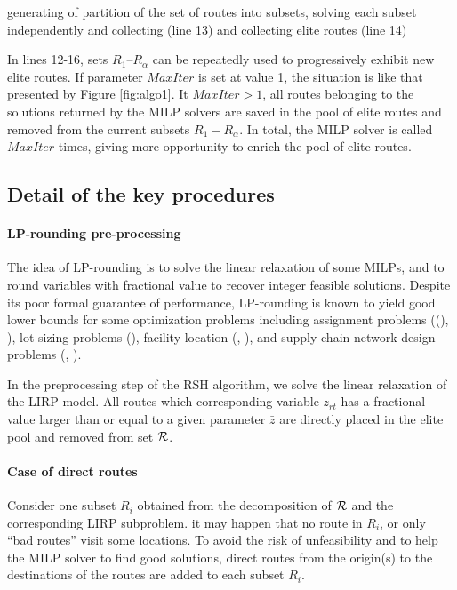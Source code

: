 \documentclass[a4paper,10pt]{article}
\begin{document}
\begin{linenumbers}
 generating of partition of the set of routes into subsets, solving each subset independently and collecting  (line 13) and collecting elite routes (line 14)

In lines 12-16, sets $R_1$--$R_\alpha$ can be repeatedly used to progressively exhibit new elite routes. 
If parameter $MaxIter$ is set at value 1, the situation is like that presented by Figure \ref{fig:algo1}. 
It $MaxIter > 1$,  all routes belonging to the solutions returned by the MILP solvers are saved in the pool of elite routes and removed from the current subsets $R_1 - R_\alpha $. 
In total, the MILP solver is called $MaxIter$ times, giving more opportunity to enrich the pool of elite routes. 

\subsection{Detail of the key procedures} \label{sec:details}


\paragraph{LP-rounding pre-processing}

	The idea of LP-rounding is to solve the linear relaxation of some MILPs, 
	and to round variables with fractional value to recover integer feasible solutions. 
	Despite its poor formal guarantee of performance, LP-rounding is known to yield good lower bounds 
	for some optimization problems including assignment problems ((\cite{BvN82}), \cite{FW07}), 
	lot-sizing problems (\cite{HNS07}), facility location (\cite{LSS2012}, \cite{CPS06}), 
	and supply chain network design problems  (\cite{VMN06}, \cite{Thanh2010}).
	
	In the preprocessing step of the RSH algorithm, we solve the linear relaxation of the LIRP model. All routes which corresponding variable $z_{rt}$ has a fractional value larger than or equal to a given parameter $\bar{z}$  are directly placed in the elite pool and removed from set $\mathcal{R}$.
	
	
\paragraph{Case of direct routes}

	Consider one subset $R_i$ obtained from the decomposition of $\mathcal{R}$ and the corresponding LIRP subproblem. it may happen that no route in $R_i$, or only ``bad routes'' visit some locations. To avoid the risk of unfeasibility and to help the MILP solver to find good solutions, direct routes from the origin(s) to the destinations of the routes are added to each subset $R_i$. 
	



\end{linenumbers}
\end{document}

